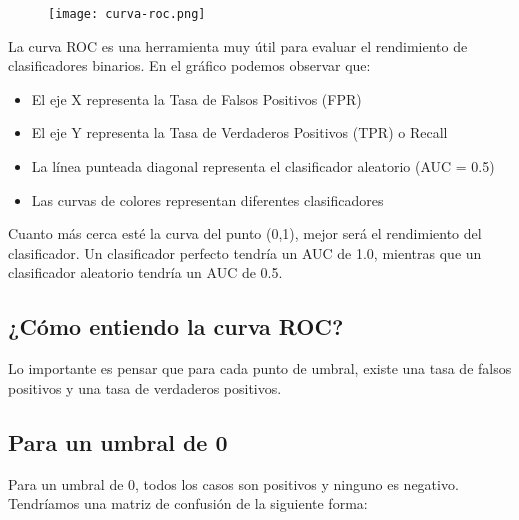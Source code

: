 \documentclass[12pt]{article}
\begin{document}
\begin{figure}[H]
    \centering
    \texttt{[image: curva-roc.png]}
\end{figure}

La curva ROC es una herramienta muy útil para evaluar el rendimiento de clasificadores binarios. En el gráfico podemos observar que:

\begin{itemize}
    \item El eje X representa la Tasa de Falsos Positivos (FPR)
    \item El eje Y representa la Tasa de Verdaderos Positivos (TPR) o Recall
    \item La línea punteada diagonal representa el clasificador aleatorio (AUC = 0.5)
    \item Las curvas de colores representan diferentes clasificadores
\end{itemize}

Cuanto más cerca esté la curva del punto (0,1), mejor será el rendimiento del clasificador. Un clasificador perfecto tendría un AUC de 1.0, mientras que un clasificador aleatorio tendría un AUC de 0.5.

\subsection{¿Cómo entiendo la curva ROC?}

Lo importante es pensar que para cada punto de umbral, existe una tasa de falsos positivos y una tasa de verdaderos positivos.

\subsection{Para un umbral de 0}

Para un umbral de 0, todos los casos son positivos y ninguno es negativo. Tendríamos una matriz de confusión de la siguiente forma:

\begin{center}
\end{center}
\end{document}
